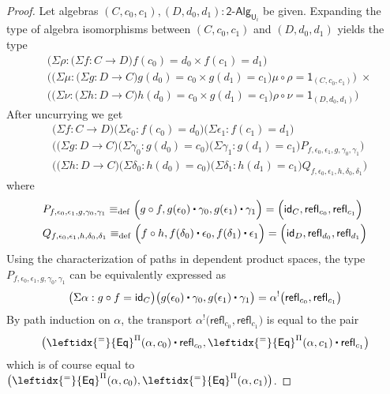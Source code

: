 \documentclass[reqno,10pt,a4paper,oneside]{amsart}
\numberwithin{equation}{section}
\theoremstyle{mythm}
\theoremstyle{mydef}
\theoremstyle{myrmk}
\newcommand{\deq}{\equiv}
\newcommand{\defeq}{\deq_{\mathrm{def}}}
\newcommand{\idfun}[1]{\mathsf{id}_{#1}}
\newcommand{\comp}{\circ}
\newcommand{\ct}{%
  \mathchoice{\mathbin{\raisebox{0.5ex}{$\displaystyle\centerdot$}}}%
             {\mathbin{\raisebox{0.5ex}{$\centerdot$}}}%
             {\mathbin{\raisebox{0.25ex}{$\scriptstyle\,\centerdot\,$}}}%
             {\mathbin{\raisebox{0.1ex}{$\scriptscriptstyle\,\centerdot\,$}}}}
\newcommand{\happly}{\leftidx{^=}{\mathsf{Eq}}^{\Pi}}
\newcommand{\refl}{\mathsf{refl}}
\newcommand{\one}{\mathsf{1}}
\newcommand{\UU}{\mathsf{U}}
\newcommand{\BoolAlg}{\mathsf{2}\text{-}\mathsf{Alg}}
\begin{document}
\begin{proof}
Let algebras $(C,c_0,c_1), (D,d_0,d_1) : \BoolAlg_{\UU_i}$ be given. Expanding the type of algebra isomorphisms between $(C,c_0,c_1)$ and $(D,d_0,d_1)$ yields the type
\begin{align*}
& \big(\Sigma \rho : \big(\Sigma f:C\to D\big) f(c_0) =d_0 \times f(c_1) = d_1\big) \\
& \Big(\big( \Sigma \mu : \big(\Sigma g:D\to C\big) g(d_0)=c_0 \times g(d_1)=c_1\big) \mu \comp \rho = \one_{(C,c_0,c_1)}\Big) \; \times \\
& \Big(\big(\Sigma \nu : \big(\Sigma h:D\to C \big) h(d_0)=c_0 \times g(d_1)=c_1\big) \rho \comp \nu = \one_{(D,d_0,d_1)}\Big)
\end{align*}
After uncurrying we get
\begin{align*}
& \big(\Sigma f:C\to D\big) \big(\Sigma \epsilon_0 : f(c_0) =d_0\big) \big(\Sigma \epsilon_1 : f(c_1) = d_1\big) \\
& \Big(\big(\Sigma g:D\to C\big) \big(\Sigma \gamma_0 : g(d_0)=c_0 \big) \big(\Sigma \gamma_1 : g(d_1)=c_1\big) P_{f,\epsilon_0,\epsilon_1,g,\gamma_0,\gamma_1}\Big) \\ 
& \Big(\big(\Sigma h:D\to C\big) \big(\Sigma \delta_0 : h(d_0)=c_0 \big) \big(\Sigma \delta_1 : h(d_1)=c_1\big) Q_{f,\epsilon_0,\epsilon_1,h,\delta_0,\delta_1}\Big)
\end{align*}
where
\begin{align*}
& P_{f,\epsilon_0,\epsilon_1,g,\gamma_0,\gamma_1} \defeq \Big(g \comp f, g(\epsilon_0) \ct \gamma_0, g(\epsilon_1) \ct \gamma_1\Big) = \Big(\idfun{C}, \refl_{c_0}, \refl_{c_1}\Big) \\
& Q_{f,\epsilon_0,\epsilon_1,h,\delta_0,\delta_1} \defeq \Big(f \comp h, f(\delta_0) \ct \epsilon_0, f(\delta_1) \ct \epsilon_1\Big) = \Big(\idfun{D}, \refl_{d_0}, \refl_{d_1}\Big)
\end{align*}
Using the characterization of paths in dependent product spaces, the type $P_{f,\epsilon_0,\epsilon_1,g,\gamma_0,\gamma_1}$ can be equivalently expressed as
\begin{align*}
\big(\Sigma \alpha : g \comp f = \idfun{C}\big) \big(g(\epsilon_0) \ct \gamma_0, g(\epsilon_1) \ct \gamma_1\big) = \alpha^{!}\big(\refl_{c_0}, \refl_{c_1}\big)
\end{align*}
By path induction on $\alpha$, the transport $\alpha^{!}\big(\refl_{c_0}, \refl_{c_1}\big)$ is equal to the pair 
\[\big(\happly(\alpha,c_0) \ct \refl_{c_0}, \happly(\alpha,c_1) \ct \refl_{c_1}\big)\]
which is of course equal to $\big(\happly(\alpha,c_0), \happly(\alpha,c_1)\big)$.

\end{proof}
\end{document}
